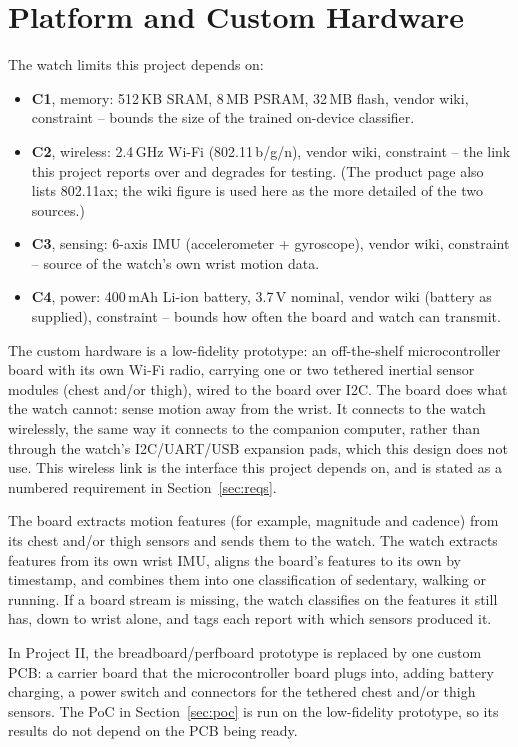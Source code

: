 \section{Platform and Custom Hardware}
\label{sec:platform}

The watch limits this project depends on:
\begin{itemize}
\item \textbf{C1}, memory: 512\,KB SRAM, 8\,MB PSRAM, 32\,MB flash,
vendor wiki, constraint -- bounds the size of the trained
on-device classifier.
\item \textbf{C2}, wireless: 2.4\,GHz Wi-Fi (802.11\,b/g/n), vendor
wiki, constraint -- the link this project reports over and
degrades for testing. (The product page also lists 802.11ax; the
wiki figure is used here as the more detailed of the two sources.)
\item \textbf{C3}, sensing: 6-axis IMU (accelerometer + gyroscope),
vendor wiki, constraint -- source of the watch's own wrist motion
data.
\item \textbf{C4}, power: 400\,mAh Li-ion battery, 3.7\,V nominal,
vendor wiki (battery as supplied), constraint -- bounds how often
the board and watch can transmit.
\end{itemize}

The custom hardware is a low-fidelity prototype: an off-the-shelf
microcontroller board with its own Wi-Fi radio, carrying one or two
tethered inertial sensor modules (chest and/or thigh), wired to the
board over I2C. The board does what the watch cannot: sense motion
away from the wrist. It connects to the watch wirelessly, the same
way it connects to the companion computer, rather than through the
watch's I2C/UART/USB expansion pads, which this design does not use.
This wireless link is the interface this project depends on, and
is stated as a numbered requirement in Section~\ref{sec:reqs}.

The board extracts motion features (for example, magnitude and
cadence) from its chest and/or thigh sensors and sends them to the
watch. The watch extracts features from its own wrist IMU, aligns
the board's features to its own by timestamp, and combines them
into one classification of sedentary, walking or running. If a
board stream is missing, the watch classifies on the features it
still has, down to wrist alone, and tags each report with which
sensors produced it.

In Project II, the breadboard/perfboard prototype is replaced by
one custom PCB: a carrier board that the microcontroller board
plugs into, adding battery charging, a power switch and connectors
for the tethered chest and/or thigh sensors. The PoC in
Section~\ref{sec:poc} is run on the low-fidelity prototype, so its
results do not depend on the PCB being ready.
